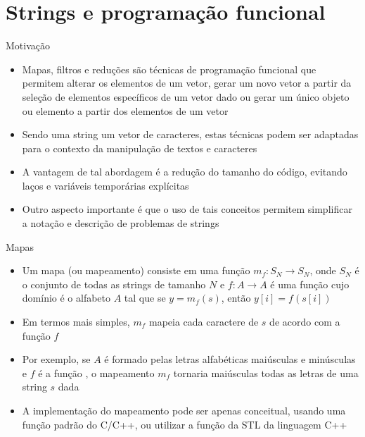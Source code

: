 \section{Strings e programação funcional}

\begin{frame}[fragile]{Motivação}

    \begin{itemize}
        \item Mapas, filtros e reduções são técnicas de programação funcional que permitem alterar os elementos de um vetor, gerar um novo vetor a partir da seleção de elementos específicos de um vetor dado ou gerar um único objeto ou elemento a partir dos elementos de um vetor

        \item Sendo uma string um vetor de caracteres, estas técnicas podem ser adaptadas para o contexto da manipulação de textos e caracteres

        \item A vantagem de tal abordagem é a redução do tamanho do código, evitando laços e
            variáveis temporárias explícitas

        \item Outro aspecto importante é que o uso de tais conceitos permitem simplificar a
            notação e descrição de problemas de strings
    \end{itemize}

\end{frame}

\begin{frame}[fragile]{Mapas}

    \begin{itemize}
        \item Um mapa (ou mapeamento) consiste em uma função $m_f: S_N \to S_N$, 
            onde $S_N$ é o conjunto de todas as strings de tamanho $N$ e $f: A \to A$ é uma função 
            cujo domínio é o alfabeto $A$ tal que se $y = m_f(s)$, então $y[i] = f(s[i])$

        \item Em termos mais simples, $m_f$ mapeia cada caractere de $s$ de acordo com a função $f$

        \item Por exemplo, se $A$ é formado pelas letras alfabéticas maiúsculas e minúsculas e 
            $f$ é a função , o mapeamento $m_f$ tornaria maiúsculas todas as 
            letras de uma string $s$ dada

        \item A implementação do mapeamento pode ser apenas conceitual, usando uma função padrão
            do C/C++, ou utilizar a função  da STL da linguagem C++
    \end{itemize}

\end{frame}

